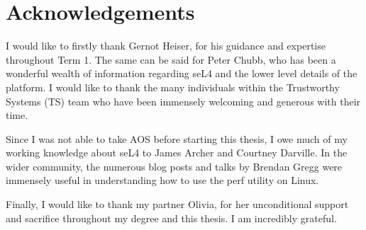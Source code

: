\chapter*{Acknowledgements}\label{ch:ack}

I would like to firstly thank Gernot Heiser, for his guidance and expertise throughout Term 1. The same can be said for Peter Chubb, who has been a wonderful wealth of information regarding seL4 and the lower level details of the platform. I would like to thank the many individuals within the Trustworthy Systems (TS) team who have been immensely welcoming and generous with their time.

Since I was not able to take AOS before starting this thesis, I owe much of my working knowledge about seL4 to James Archer and Courtney Darville. In the wider community, the numerous blog posts and talks by Brendan Gregg were immensely useful in understanding how to use the perf utility on Linux.

Finally, I would like to thank my partner Olivia, for her unconditional support and sacrifice throughout my degree and this thesis. I am incredibly grateful.

